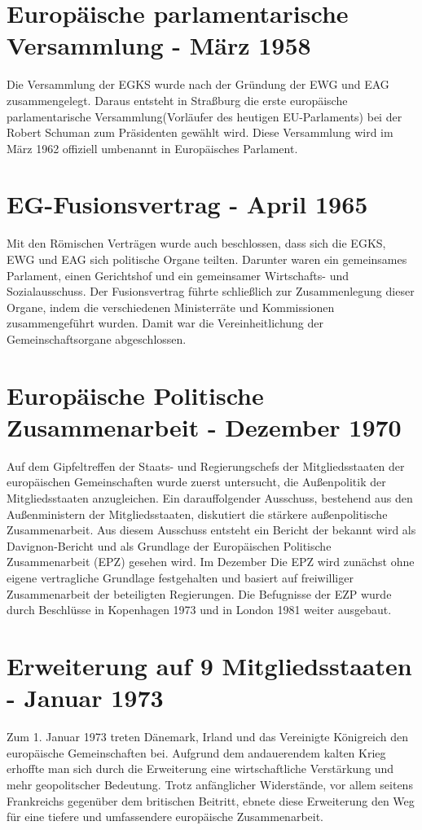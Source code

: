 \documentclass[12pt, oneside]{book} %
\begin{document}
\section{Europäische parlamentarische Versammlung - März 1958}
Die Versammlung der EGKS wurde nach der Gründung der EWG und EAG zusammengelegt. Daraus entsteht in Straßburg die erste europäische parlamentarische Versammlung(Vorläufer des heutigen EU-Parlaments) bei der Robert Schuman zum Präsidenten gewählt wird. Diese Versammlung wird im März 1962 offiziell umbenannt in Europäisches Parlament.


\section{EG-Fusionsvertrag - April 1965}
Mit den Römischen Verträgen wurde auch beschlossen, dass sich die EGKS, EWG und EAG sich politische Organe teilten. Darunter waren ein gemeinsames Parlament, einen Gerichtshof und ein gemeinsamer Wirtschafts- und Sozialausschuss. Der Fusionsvertrag führte schließlich zur Zusammenlegung dieser Organe, indem die verschiedenen Ministerräte und Kommissionen zusammengeführt wurden. Damit war die Vereinheitlichung der Gemeinschaftsorgane abgeschlossen.

\section{Europäische Politische Zusammenarbeit - Dezember 1970}
Auf dem Gipfeltreffen der Staats- und Regierungschefs der Mitgliedsstaaten der europäischen Gemeinschaften wurde zuerst untersucht, die Außenpolitik der Mitgliedsstaaten anzugleichen. Ein darauffolgender Ausschuss, bestehend aus den Außenministern der Mitgliedsstaaten, diskutiert die stärkere außenpolitische Zusammenarbeit. Aus diesem Ausschuss entsteht ein Bericht der bekannt wird als Davignon-Bericht und als Grundlage der Europäischen Politische Zusammenarbeit (EPZ) gesehen wird. Im Dezember Die EPZ wird zunächst ohne eigene vertragliche Grundlage festgehalten und basiert auf freiwilliger Zusammenarbeit der beteiligten Regierungen. Die Befugnisse der EZP wurde durch Beschlüsse in Kopenhagen 1973 und in London 1981 weiter ausgebaut.

\section{Erweiterung auf 9 Mitgliedsstaaten - Januar 1973}
Zum 1. Januar 1973 treten Dänemark, Irland und das Vereinigte Königreich den europäische Gemeinschaften bei. Aufgrund dem andauerendem kalten Krieg erhoffte man sich durch die Erweiterung eine wirtschaftliche Verstärkung und mehr geopolitscher Bedeutung. Trotz anfänglicher Widerstände, vor allem seitens Frankreichs gegenüber dem britischen Beitritt, ebnete diese Erweiterung den Weg für eine tiefere und umfassendere europäische Zusammenarbeit.
\end{document}
